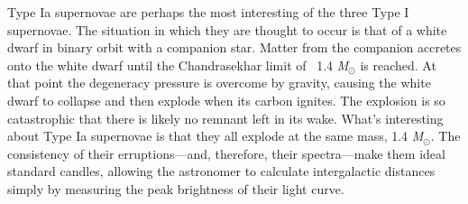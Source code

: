 		Type Ia supernovae are perhaps the most interesting of the three Type I supernovae. The situation in which they are thought to occur is that of a white dwarf in binary orbit with a companion star. Matter from the companion accretes onto the white dwarf until the Chandrasekhar limit of \ 1.4 \emph{M}$_\odot$ is reached. At that point the degeneracy pressure is overcome by gravity, causing the white dwarf to collapse and then explode when its carbon ignites. The explosion is so catastrophic that there is likely no remnant left in its wake. What's interesting about Type Ia supernovae is that they all explode at the same mass, 1.4 \emph{M}$_\odot$. The consistency of their erruptions---and, therefore, their spectra---make them ideal standard candles, allowing the astronomer to calculate intergalactic distances simply by measuring the peak brightness of their light curve.






